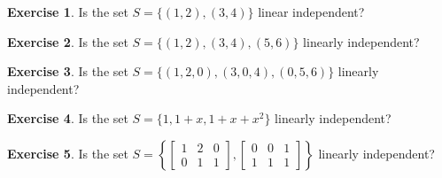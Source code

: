 \documentclass{beamer}
\newcommand{\fn}{\insertframenumber}
\theoremstyle{definition}
\newtheorem{exercise}{Exercise}
\begin{document}
\begin{frame}{\fn}
	\begin{exercise}
		Is the set $S=\{(1,2),(3,4)\}$ linear independent?
	\end{exercise}
	\begin{exercise}
		Is the set $S=\{(1,2),(3,4), (5,6)\}$ linearly independent?
	\end{exercise}
	\begin{exercise}
		Is the set $S=\{(1,2,0),(3,0,4), (0,5,6)\}$ linearly independent?
	\end{exercise}
	\begin{exercise}
		Is the set $S=\{1,1+x,1+x+x^2\}$ linearly independent?
	\end{exercise}
	\begin{exercise}
		Is the set $S=\left\{\begin{bmatrix}1&2&0\\0&1&1\end{bmatrix},\begin{bmatrix}0&0&1\\1&1&1\end{bmatrix}\right\}$ linearly independent?
	\end{exercise}
\end{frame}
\end{document}

